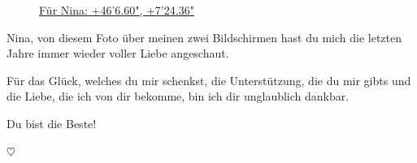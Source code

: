 %
\pagestyle{empty}
\hfill
\vfill
\begin{figure}[h]
	\noindent{}%
	\caption{\href{http://maps.google.com/maps?q=46.918577,7.440087&num=1&t=h&sll=46.9185,7.4401&sspn=0.015244,0.032015&hl=en&ie=UTF8&ll=46.918672,7.440126&spn=0.005753,0.012821&z=17}{Für Nina: +46'6.60", +7'24.36"}}%
	\label{fig:<3}%
\end{figure}%
\vfill
Nina, von diesem Foto über meinen zwei Bildschirmen hast du mich die letzten Jahre immer wieder voller Liebe angeschaut.

Für das Glück, welches du mir schenkst, die Unterstützung, die du mir gibts und die Liebe, die ich von dir bekomme, bin ich dir unglaublich dankbar.

Du bist die Beste!
\newline

\centering
{\color{red}$\heartsuit$}
\vfill
%
